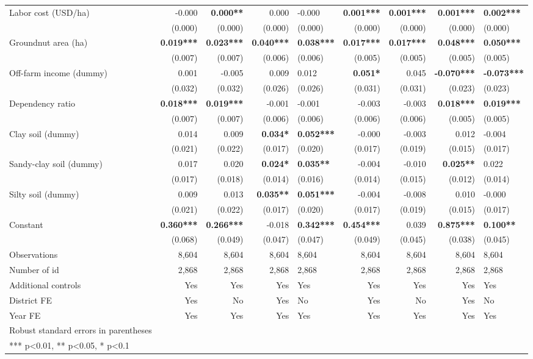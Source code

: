 \documentclass[
]{article}
\begin{document}
\begin{landscape}
\begin{longtable}[t]{lrrrlrrrl}
Labor cost (USD/ha) & -0.000 & \textbf{0.000**} & 0.000 & -0.000 & \textbf{0.001***} & \textbf{0.001***} & \textbf{0.001***} & \textbf{0.002***}\\
 & (0.000) & (0.000) & (0.000) & (0.000) & (0.000) & (0.000) & (0.000) & (0.000)\\
Groundnut area (ha) & \textbf{0.019***} & \textbf{0.023***} & \textbf{0.040***} & \textbf{0.038***} & \textbf{0.017***} & \textbf{0.017***} & \textbf{0.048***} & \textbf{0.050***}\\
 & (0.007) & (0.007) & (0.006) & (0.006) & (0.005) & (0.005) & (0.005) & (0.005)\\
\addlinespace
Off-farm income (dummy) & 0.001 & -0.005 & 0.009 & 0.012 & \textbf{0.051*} & 0.045 & \textbf{-0.070***} & \textbf{-0.073***}\\
 & (0.032) & (0.032) & (0.026) & (0.026) & (0.031) & (0.031) & (0.023) & (0.023)\\
Dependency ratio & \textbf{0.018***} & \textbf{0.019***} & -0.001 & -0.001 & -0.003 & -0.003 & \textbf{0.018***} & \textbf{0.019***}\\
 & (0.007) & (0.007) & (0.006) & (0.006) & (0.006) & (0.006) & (0.005) & (0.005)\\
Clay soil (dummy) & 0.014 & 0.009 & \textbf{0.034*} & \textbf{0.052***} & -0.000 & -0.003 & 0.012 & -0.004\\
\addlinespace
 & (0.021) & (0.022) & (0.017) & (0.020) & (0.017) & (0.019) & (0.015) & \vphantom{1} (0.017)\\
Sandy-clay soil (dummy) & 0.017 & 0.020 & \textbf{0.024*} & \textbf{0.035**} & -0.004 & -0.010 & \textbf{0.025**} & 0.022\\
 & (0.017) & (0.018) & (0.014) & (0.016) & (0.014) & (0.015) & (0.012) & (0.014)\\
Silty soil (dummy) & 0.009 & 0.013 & \textbf{0.035**} & \textbf{0.051***} & -0.004 & -0.008 & 0.010 & -0.000\\
 & (0.021) & (0.022) & (0.017) & (0.020) & (0.017) & (0.019) & (0.015) & (0.017)\\
\addlinespace
Constant & \textbf{0.360***} & \textbf{0.266***} & -0.018 & \textbf{0.342***} & \textbf{0.454***} & 0.039 & \textbf{0.875***} & \textbf{0.100**}\\
 & (0.068) & (0.049) & (0.047) & (0.047) & (0.049) & (0.045) & (0.038) & (0.045)\\
\midrule
Observations & 8,604 & 8,604 & 8,604 & 8,604 & 8,604 & 8,604 & 8,604 & 8,604\\
Number of id & 2,868 & 2,868 & 2,868 & 2,868 & 2,868 & 2,868 & 2,868 & 2,868\\
Additional controls & Yes & Yes & Yes & Yes & Yes & Yes & Yes & Yes\\
\addlinespace
District FE & Yes & No & Yes & No & Yes & No & Yes & No\\
Year FE & Yes & Yes & Yes & Yes & Yes & Yes & Yes & Yes\\
\midrule
Robust standard errors in parentheses &  &  &  &  &  &  &  & \\
*** p<0.01, ** p<0.05, * p<0.1 &  &  &  &  &  &  &  & \\*
\end{longtable}
\end{landscape}
\end{document}
